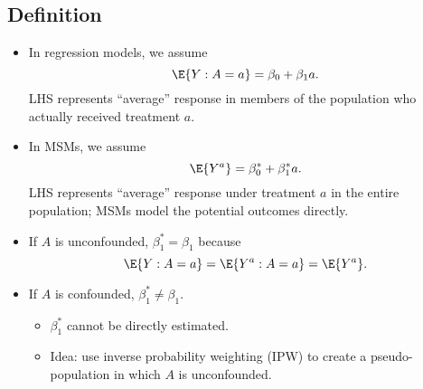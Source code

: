 \documentclass[oneside]{book}\usepackage[]{graphicx}\usepackage[svgnames]{xcolor}
\providecommand\given{} %
\renewcommand\given{\nonscript\:\delimsize\vert\nonscript\:\mathopen{}}%
\renewcommand\given{\nonscript\:\delimsize\vert\nonscript\:\mathopen{}}%
\renewcommand\given{\nonscript\:\delimsize\vert\nonscript\:\mathopen{}}%
\renewcommand\given{\nonscript\:\delimsize\vert\nonscript\:\mathopen{}}%
\renewcommand\given{\nonscript\:\delimsize\vert\nonscript\:\mathopen{}}%
\renewcommand\given{\nonscript\:\delimsize\vert\nonscript\:\mathopen{}}%
\renewcommand\given{\nonscript\:\delimsize\vert\nonscript\:\mathopen{}}%
\renewcommand\given{\nonscript\:\delimsize\vert\nonscript\:\mathopen{}}%
\renewcommand\given{\nonscript\:\delimsize\vert\nonscript\:\mathopen{}}%
\renewcommand\given{\nonscript\:\delimsize\vert\nonscript\:\mathopen{}}%
\renewcommand\given{\nonscript\:\delimsize\vert\nonscript\:\mathopen{}}%
\renewcommand\given{\nonscript\:\delimsize\vert\nonscript\:\mathopen{}}%
\renewcommand\given{\nonscript\:\delimsize\vert\nonscript\:\mathopen{}}%
\renewcommand\given{\nonscript\:\delimsize\vert\nonscript\:\mathopen{}}%
\renewcommand\given{:}
\begin{document}
\subsection*{Definition}
\begin{itemize}
      \item In regression models, we assume
            \[ \E{Y\given A=a}=\beta_0+\beta_1a. \]
            LHS represents ``average'' response in members of the population who actually received treatment $ a $.
      \item In MSMs, we assume
            \[ \E{Y^a}=\beta_0^*+\beta_1^*a. \]
            LHS represents ``average'' response under treatment $a$ in the
            entire population; MSMs model the potential outcomes
            directly.
      \item If $ A $ is unconfounded, $ \beta_1^*=\beta_1 $ because
            \[ \E{Y\given A=a}=\E{Y^a\given A=a}=\E{Y^a}. \]
      \item If $ A $ is confounded, $ \beta_1^*\ne \beta_1 $.
            \begin{itemize}
                  \item $\beta_1^*$ cannot be directly estimated.
                  \item Idea: use inverse probability weighting (IPW) to create a
                        pseudo-population in which $A$ is unconfounded.
            \end{itemize}
\end{itemize}
\end{document}

